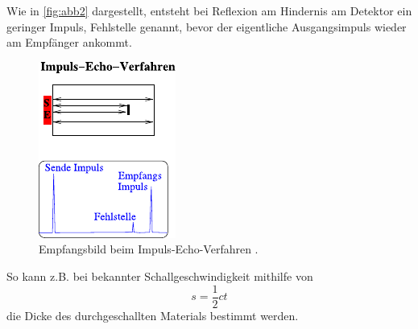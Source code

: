 Wie in \autoref{fig:abb2} dargestellt, entsteht bei Reflexion am Hindernis am Detektor ein geringer
Impuls, Fehlstelle genannt, bevor der eigentliche Ausgangsimpuls
wieder am Empfänger ankommt.

\begin{figure}
    \centering
    \includegraphics{figures/abb2.pdf}
    \caption{Empfangsbild beim Impuls-Echo-Verfahren \cite{ap06}.}
    \label{fig:abb2}
\end{figure}

So kann z.B. bei bekannter Schallgeschwindigkeit mithilfe von
\begin{equation}
    s = \dfrac{1}{2} c t
    \label{eq:schallges}
\end{equation}
die Dicke des durchgeschallten Materials bestimmt werden. 

